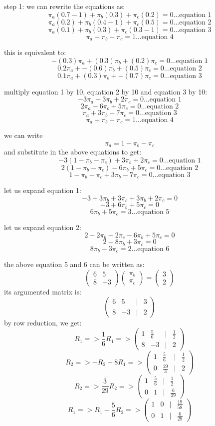 \documentclass{article}
\begin{document}
step 1: we can rewrite the equations as:
\[\pi_a(0.7 - 1) + \pi_b(0.3) + \pi_c(0.2) = 0 \ldots\text{equation 1}\]
\[\pi_a(0.2) + \pi_b(0.4 - 1) + \pi_c(0.5) = 0 \ldots\text{equation 2}\]
\[\pi_a(0.1) + \pi_b(0.3) + \pi_c(0.3 - 1) = 0 \ldots\text{equation 3}\]
\[\pi_a + \pi_b + \pi_c = 1 \ldots\text{equation 4}\]

this is equivalent to:
\[-(0.3)\pi_a + (0.3)\pi_b + (0.2)\pi_c = 0 \ldots\text{equation 1}\]
\[0.2\pi_a + -(0.6)\pi_b + (0.5)\pi_c = 0 \ldots\text{equation 2}\]
\[0.1\pi_a + (0.3)\pi_b + -(0.7)\pi_c = 0 \ldots\text{equation 3}\]

multiply equation 1 by 10, equation 2 by 10 and equation 3 by 10:
\[-3\pi_a + 3\pi_b + 2\pi_c = 0 \ldots\text{equation 1}\]
\[2\pi_a - 6\pi_b + 5\pi_c = 0 \ldots\text{equation 2}\]
\[\pi_a + 3\pi_b - 7\pi_c = 0 \ldots\text{equation 3}\]
\[\pi_a + \pi_b + \pi_c = 1 \ldots\text{equation 4}\]

we can write \[\pi_a = 1 - \pi_b - \pi_c\] and substitute in the above equations to get:
\[-3(1 - \pi_b - \pi_c) + 3\pi_b + 2\pi_c = 0 \ldots\text{equation 1}\]
\[2(1 - \pi_b - \pi_c) - 6\pi_b + 5\pi_c = 0 \ldots\text{equation 2}\]
\[1 - \pi_b - \pi_c + 3\pi_b - 7\pi_c = 0 \ldots\text{equation 3}\]

let us expand equation 1:
\[-3 + 3\pi_b + 3\pi_c + 3\pi_b + 2\pi_c = 0\]
\[-3 + 6\pi_b + 5\pi_c = 0\]
\[6\pi_b + 5\pi_c = 3 \ldots\text{equation 5}\]

let us expand equation 2:
\[2 - 2\pi_b - 2\pi_c - 6\pi_b + 5\pi_c = 0\]
\[2 - 8\pi_b + 3\pi_c = 0\]
\[8\pi_b - 3\pi_c = 2 \ldots\text{equation 6}\]

the above equation 5 and 6 can be written as:
\[\begin{pmatrix}6&5\\8&-3\end{pmatrix}\begin{pmatrix}\pi_b\\\pi_c\end{pmatrix} = \begin{pmatrix}3\\2\end{pmatrix}\]
its argumented matrix is:
\[\begin{pmatrix}6&5&|&3\\8&-3&|&2\end{pmatrix}\]
by row reduction, we get:
\[R_1 => \frac{1}{6}R_1 => \begin{pmatrix}1&\frac{5}{6}&|&\frac{1}{2}\\8&-3&|&2\end{pmatrix}\]
\[R_2 => -R_2 + 8R_1 => \begin{pmatrix}1&\frac{5}{6}&|&\frac{1}{2}\\0&\frac{29}{3}&|&2\end{pmatrix}\]
\[R_2 => \frac{3}{29}R_2 => \begin{pmatrix}1&\frac{5}{6}&|&\frac{1}{2}\\0&1&|&\frac{6}{29}\end{pmatrix}\]
\[R_1 => R_1 - \frac{5}{6}R_2 => \begin{pmatrix}1&0&|&\frac{19}{58}\\0&1&|&\frac{6}{29}\end{pmatrix}\]
\end{document}
